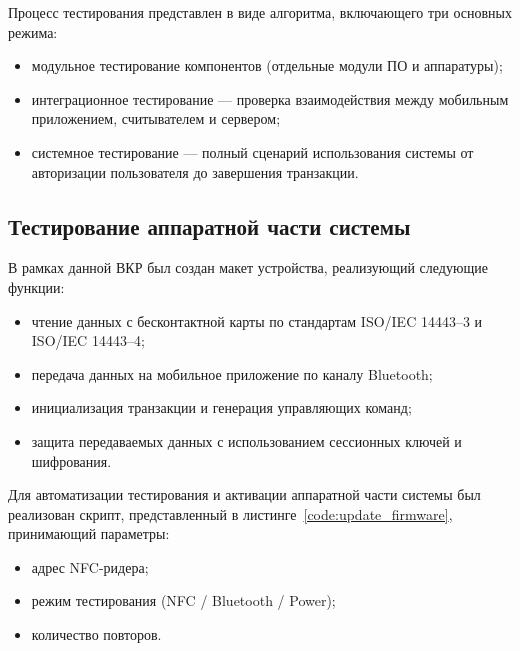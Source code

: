 Процесс тестирования представлен в виде алгоритма, включающего три основных режима:

\begin{itemize}
	\item модульное тестирование компонентов (отдельные модули ПО и аппаратуры);
	\item интеграционное тестирование — проверка взаимодействия между мобильным приложением, считывателем и сервером;
	\item системное тестирование — полный сценарий использования системы от авторизации пользователя до завершения транзакции.
\end{itemize}

\subsection{Тестирование аппаратной части системы}
В рамках данной ВКР был создан макет устройства, реализующий следующие функции:

\begin{itemize}
	\item чтение данных с бесконтактной карты по стандартам ISO/IEC 14443--3 и ISO/IEC 14443--4;
	\item передача данных на мобильное приложение по каналу Bluetooth;
	\item инициализация транзакции и генерация управляющих команд;
	\item защита передаваемых данных с использованием сессионных ключей и шифрования.
\end{itemize}

Для автоматизации тестирования и активации аппаратной части системы был реализован скрипт, представленный в листинге~\ref{code:update_firmware}, принимающий параметры:

\begin{itemize}
	\item адрес NFC-ридера;
	\item режим тестирования (NFC / Bluetooth / Power);
	\item количество повторов.
\end{itemize}


\begin{singlespacing}
	\small
	\captionsetup{labelsep=endash, justification=raggedright, singlelinecheck=off}
	
\end{singlespacing}



